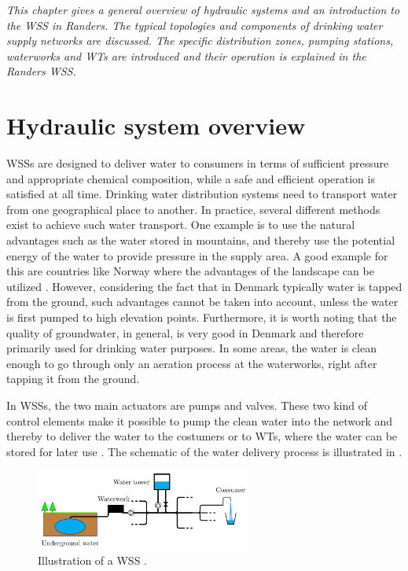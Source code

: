 \emph{This chapter gives a general overview of hydraulic systems and an introduction to the WSS in Randers. The typical topologies and components of drinking water supply networks are discussed. The specific distribution zones, pumping stations, waterworks and WTs are introduced and their operation is explained in the Randers WSS.}

\section{Hydraulic system overview}
\label{hydraulic_system_overview}

WSSs are designed to deliver water to consumers in terms of sufficient pressure and appropriate chemical composition, while a safe and efficient operation is satisfied at all time. Drinking water distribution systems need to transport water from one geographical place to another. In practice, several different methods exist to achieve such water transport. One example is to use the natural advantages such as the water stored in mountains, and thereby use the potential energy of the water to provide pressure in the supply area. A good example for this are countries like Norway where the advantages of the landscape can be utilized \cite{norway_mountains}. However, considering the fact that in Denmark typically water is tapped from the ground, such advantages cannot be taken into account, unless the water is first pumped to high elevation points. Furthermore, it is worth noting that the quality of groundwater, in general, is very good in Denmark and therefore primarily used for drinking water purposes. In some areas, the water is clean enough to go through only an aeration process at the waterworks, right after tapping it from the ground. 

In WSSs, the two main actuators are pumps and valves. These two kind of control elements make it possible to pump the clean water into the network and thereby to deliver the water to the costumers or to WTs, where the water can be stored for later use \cite{prahata}. The schematic of the water delivery process is illustrated in .

\begin{figure}[H]
\centering
\includegraphics[width=0.63\textwidth]{report/pictures/WSS_illustration}
\caption{Illustration of a WSS \cite{kenneth_houe}.}
\label{fig:WSS_example}
\end{figure}

